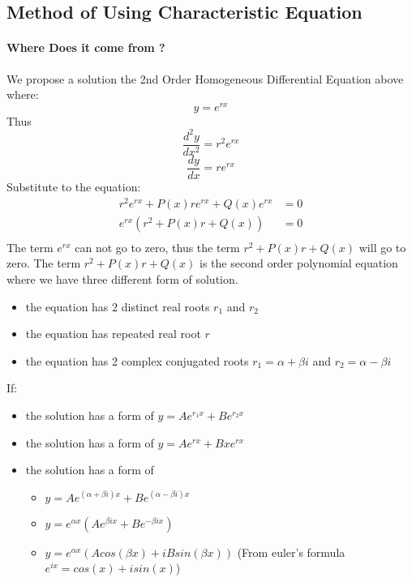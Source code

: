 \subsection{Method of Using Characteristic Equation}
\begin{tcolorbox}[title=Method,breakable]
	\paragraph{Where Does it come from ?}
	We propose a solution the 2nd Order Homogeneous Differential Equation above where:
	\[
	y = e^{rx}
	\]
	Thus
	\[
	\frac{d^2y}{dx^2}= r^2e^{rx}
	\]
	\[
	\frac{dy}{dx} = re^{rx}
	\]
	Substitute to the equation:
	\[
	\begin{split}
		r^2e^{rx} + P(x)re^{rx} + Q(x)e^{rx} &= 0 \\
		e^{rx} (r^2 + P(x)r + Q(x)) &= 0 \\
	\end{split}
	\]
	The term $e^{rx}$ can not go to zero, thus the term $r^2 + P(x)r + Q(x)$ will go to zero. The term $r^2 + P(x)r + Q(x)$ is the second order polynomial equation where we have three different form of solution.
	\begin{itemize}
		\item { the equation has 2 distinct real roots \(r_1\) and \(r_2\)}
		\item { the equation has repeated real root \(r\)}
		\item { the equation has 2 complex conjugated roots \(r_1 = \alpha + \beta i\) and \(r_2 = \alpha - \beta i\)}
	\end{itemize}
	If:
	\begin{itemize}
		\item { the solution has a form of \(y = Ae^{r_1x} + Be^{r_2x}\)}
		\item { the solution has a form of \(y = Ae^{rx} + Bxe^{rx}\)}
		\item { the solution has a form of}
		\begin{itemize}
			\item \(y = Ae^{(\alpha + \beta i)x} + Be^{(\alpha - \beta i)x}\)
			\item \(y = e^{\alpha x}(Ae^{\beta ix} + Be^{-\beta ix})\)
			\item \(y = e^{\alpha x}(A cos (\beta x) + iB sin (\beta x))\) (From euler's formula \(e^{ix} = cos(x)+isin(x)\))
		\end{itemize}
	\end{itemize}

\end{tcolorbox}

